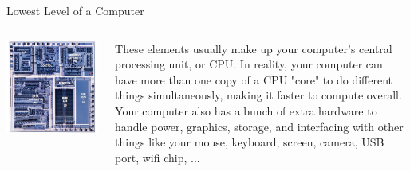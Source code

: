 \documentclass[aspectratio=169]{beamer}
\begin{document}
\begin{frame}{Lowest Level of a Computer}

    \begin{columns}
        \begin{column}{0.5\textwidth}
            \includegraphics[width=\textwidth]{imgs/vis_5.jpg}
        \end{column}
        \begin{column}{0.5\textwidth}
            These elements usually make up your computer's central processing unit, or CPU.
            \vspace{\baselineskip}
            In reality, your computer can have more than one copy of a CPU "core" to do different things simultaneously, making it faster to compute overall.
            \vspace{\baselineskip}
            Your computer also has a bunch of extra hardware to handle power, graphics, storage, and interfacing with other things like your mouse, keyboard, screen, camera, USB port, wifi chip, ...
        \end{column}
    \end{columns}

\end{frame}
\end{document}
